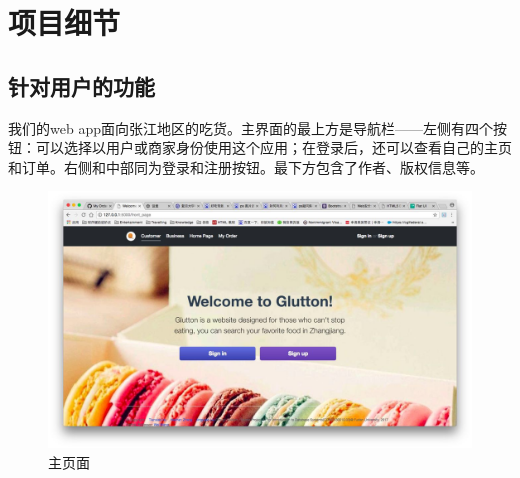 \documentclass[12pt, oneside,a4paper]{article}
\begin{document}
\section{项目细节}
 \subsection{针对用户的功能}
我们的web app面向张江地区的吃货。主界面的最上方是导航栏——左侧有四个按钮：可以选择以用户或商家身份使用这个应用；在登录后，还可以查看自己的主页和订单。右侧和中部同为登录和注册按钮。最下方包含了作者、版权信息等。
 \begin{figure}[H]
   \centering
     \includegraphics[width=6.00in]{cu-front.jpg}
     \caption{\small{主页面}}
  \end{figure}
\end{document}
